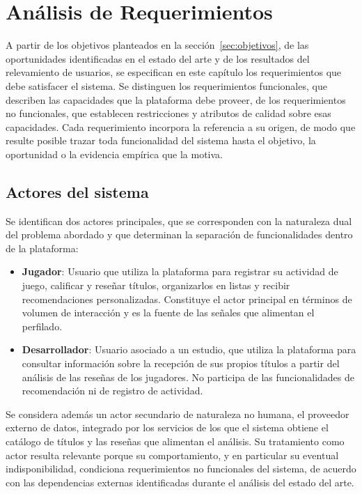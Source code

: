 \chapter{Análisis de Requerimientos}\label{chapter:requerimientos}

A partir de los objetivos planteados en la sección~\ref{sec:objetivos}, de las oportunidades identificadas en el estado del arte y de los resultados del relevamiento de usuarios, se especifican en este capítulo los requerimientos que debe satisfacer el sistema. Se distinguen los requerimientos funcionales, que describen las capacidades que la plataforma debe proveer, de los requerimientos no funcionales, que establecen restricciones y atributos de calidad sobre esas capacidades. Cada requerimiento incorpora la referencia a su origen, de modo que resulte posible trazar toda funcionalidad del sistema hasta el objetivo, la oportunidad o la evidencia empírica que la motiva.

\section{Actores del sistema}\label{sec:actores}

Se identifican dos actores principales, que se corresponden con la naturaleza dual del problema abordado y que determinan la separación de funcionalidades dentro de la plataforma:

\begin{itemize}
	\item \textbf{Jugador}: Usuario que utiliza la plataforma para registrar su actividad de juego, calificar y reseñar títulos, organizarlos en listas y recibir recomendaciones personalizadas. Constituye el actor principal en términos de volumen de interacción y es la fuente de las señales que alimentan el perfilado.
	\item \textbf{Desarrollador}: Usuario asociado a un estudio, que utiliza la plataforma para consultar información sobre la recepción de sus propios títulos a partir del análisis de las reseñas de los jugadores. No participa de las funcionalidades de recomendación ni de registro de actividad.
\end{itemize}

Se considera además un actor secundario de naturaleza no humana, el proveedor externo de datos, integrado por los servicios de los que el sistema obtiene el catálogo de títulos y las reseñas que alimentan el análisis. Su tratamiento como actor resulta relevante porque su comportamiento, y en particular su eventual indisponibilidad, condiciona requerimientos no funcionales del sistema, de acuerdo con las dependencias externas identificadas durante el análisis del estado del arte.

